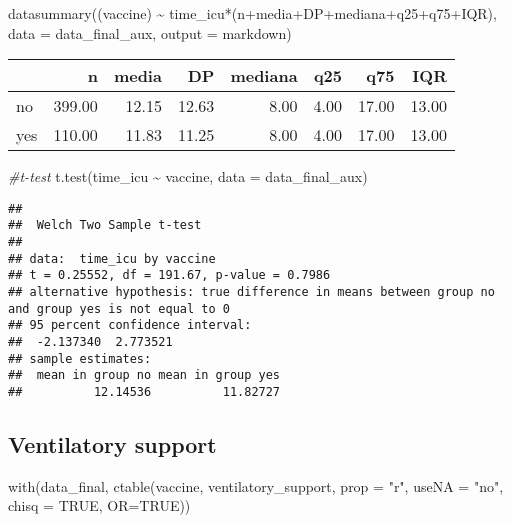 \documentclass[
]{article}
\newenvironment{Shaded}{\begin{snugshade}}{\end{snugshade}}
\newcommand{\AttributeTok}[1]{\textcolor[rgb]{0.77,0.63,0.00}{#1}}
\newcommand{\CommentTok}[1]{\textcolor[rgb]{0.56,0.35,0.01}{\textit{#1}}}
\newcommand{\ConstantTok}[1]{\textcolor[rgb]{0.00,0.00,0.00}{#1}}
\newcommand{\FunctionTok}[1]{\textcolor[rgb]{0.00,0.00,0.00}{#1}}
\newcommand{\NormalTok}[1]{#1}
\newcommand{\SpecialCharTok}[1]{\textcolor[rgb]{0.00,0.00,0.00}{#1}}
\newcommand{\StringTok}[1]{\textcolor[rgb]{0.31,0.60,0.02}{#1}}
\begin{document}
\begin{Shaded}
\begin{Highlighting}[]
\FunctionTok{datasummary}\NormalTok{((vaccine) }\SpecialCharTok{\textasciitilde{}}\NormalTok{ time\_icu}\SpecialCharTok{*}\NormalTok{(n}\SpecialCharTok{+}\NormalTok{media}\SpecialCharTok{+}\NormalTok{DP}\SpecialCharTok{+}\NormalTok{mediana}\SpecialCharTok{+}\NormalTok{q25}\SpecialCharTok{+}\NormalTok{q75}\SpecialCharTok{+}\NormalTok{IQR),}
            \AttributeTok{data =}\NormalTok{ data\_final\_aux, }\AttributeTok{output =} \StringTok{\textquotesingle{}markdown\textquotesingle{}}\NormalTok{)}
\end{Highlighting}
\end{Shaded}

\begin{longtable}[]{@{}lrrrrrrr@{}}
\toprule
& n & media & DP & mediana & q25 & q75 & IQR \\
\midrule
\endhead
no & 399.00 & 12.15 & 12.63 & 8.00 & 4.00 & 17.00 & 13.00 \\
yes & 110.00 & 11.83 & 11.25 & 8.00 & 4.00 & 17.00 & 13.00 \\
\bottomrule
\end{longtable}

\begin{Shaded}
\begin{Highlighting}[]
\CommentTok{\#t{-}test}
\FunctionTok{t.test}\NormalTok{(time\_icu }\SpecialCharTok{\textasciitilde{}}\NormalTok{ vaccine, }\AttributeTok{data =}\NormalTok{ data\_final\_aux)}
\end{Highlighting}
\end{Shaded}

\begin{verbatim}
## 
##  Welch Two Sample t-test
## 
## data:  time_icu by vaccine
## t = 0.25552, df = 191.67, p-value = 0.7986
## alternative hypothesis: true difference in means between group no and group yes is not equal to 0
## 95 percent confidence interval:
##  -2.137340  2.773521
## sample estimates:
##  mean in group no mean in group yes 
##          12.14536          11.82727
\end{verbatim}

\hypertarget{ventilatory-support}{%
\subsection{Ventilatory support}\label{ventilatory-support}}

\begin{Shaded}
\begin{Highlighting}[]
\FunctionTok{with}\NormalTok{(data\_final, }\FunctionTok{ctable}\NormalTok{(vaccine, ventilatory\_support, }\AttributeTok{prop =} \StringTok{"r"}\NormalTok{, }\AttributeTok{useNA =} \StringTok{"no"}\NormalTok{, }\AttributeTok{chisq =} \ConstantTok{TRUE}\NormalTok{, }\AttributeTok{OR=}\ConstantTok{TRUE}\NormalTok{))}
\end{Highlighting}
\end{Shaded}
\end{document}
